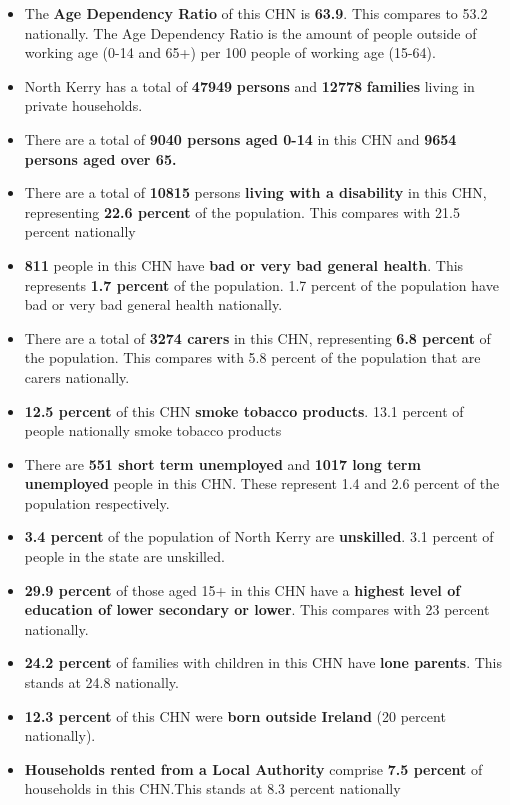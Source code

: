 \documentclass{article}
\begin{document}
\begin{itemize}

\item The \textbf{Age Dependency Ratio} of this CHN is  \textbf{63.9}. This compares to 53.2 nationally. The Age Dependency Ratio is the amount of people outside of working age (0-14 and 65+) per 100 people of working age (15-64). 

\item North Kerry has a total of \textbf{\num{47949}} \textbf{persons} and  \textbf{\num{12778}} \textbf{families} living in private households.

\item There are a total of \textbf{\num{9040} persons aged 0-14} in this CHN and \textbf{\num{9654} persons aged over 65.} 

\item There are a total of \textbf{\num{10815}} persons \textbf{living with a disability} in this CHN, representing \textbf{22.6 percent} of the population. This compares with  21.5 percent nationally

\item \textbf{\num{811}} people in this CHN have \textbf{bad or very bad general health}. This represents \textbf{1.7 percent} of the population. 1.7 percent of the population have bad or very bad general health nationally. 

\item There are a total of \textbf{\num{3274} carers} in this CHN, representing \textbf{6.8 percent} of the population. This compares with 5.8 percent of the population that are carers nationally. 

\item \textbf{12.5 percent} of this CHN \textbf{smoke tobacco products}. 13.1 percent of people nationally smoke tobacco products

\item There are \textbf{\num{551} short term unemployed} and \textbf{\num{1017} long term unemployed} people in this CHN. These represent 1.4 and 2.6 percent of the population respectively.

\item  \textbf{3.4 percent} of the population of North Kerry are \textbf{unskilled}. 3.1 percent of people in the state are unskilled.

\item \textbf{29.9 percent} of those aged 15+ in this CHN have a \textbf{highest level of education of lower secondary or lower}. This compares with 23 percent nationally. 

\item \textbf{24.2 percent} of families with children in this CHN have \textbf{lone parents}. This stands at 24.8 nationally.

\item \textbf{12.3 percent} of this CHN were \textbf{born outside Ireland} (20 percent nationally).

\item \textbf{Households rented from a Local Authority} comprise \textbf{7.5 percent} of households in this CHN.This stands at 8.3 percent nationally

\end{itemize}
\end{document}
